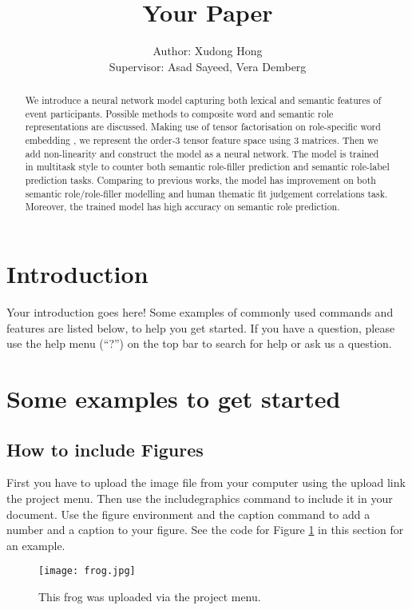 \documentclass[a4paper]{article}
\title{Your Paper}
\author{Author: Xudong Hong \\ 
Supervisor: Asad Sayeed, Vera Demberg}
\begin{document}
\maketitle

\begin{abstract}
We introduce a neural network model capturing both lexical and semantic features of event participants. Possible methods to composite word and semantic role representations are discussed. Making use of tensor factorisation on role-specific word embedding \citep{tilk-EtAl:2016:EMNLP2016}, we represent the order-3 tensor feature space using 3 matrices. Then we add non-linearity and construct the model as a neural network. The model is trained in multitask style to counter both semantic role-filler prediction and semantic role-label prediction tasks. Comparing to previous works, the model has improvement on both semantic role/role-filler modelling and human thematic fit judgement correlations task. Moreover, the trained model has high accuracy on semantic role prediction. 
\end{abstract}

\section{Introduction}

Your introduction goes here! Some examples of commonly used commands and features are listed below, to help you get started. If you have a question, please use the help menu (``?'') on the top bar to search for help or ask us a question. 






\section{Some examples to get started}

\subsection{How to include Figures}

First you have to upload the image file from your computer using the upload link the project menu. Then use the includegraphics command to include it in your document. Use the figure environment and the caption command to add a number and a caption to your figure. See the code for Figure \ref{fig:frog} in this section for an example.

\begin{figure}
\centering
\texttt{[image: frog.jpg]}
\caption{\label{fig:frog}This frog was uploaded via the project menu.}
\end{figure}
\end{document}
